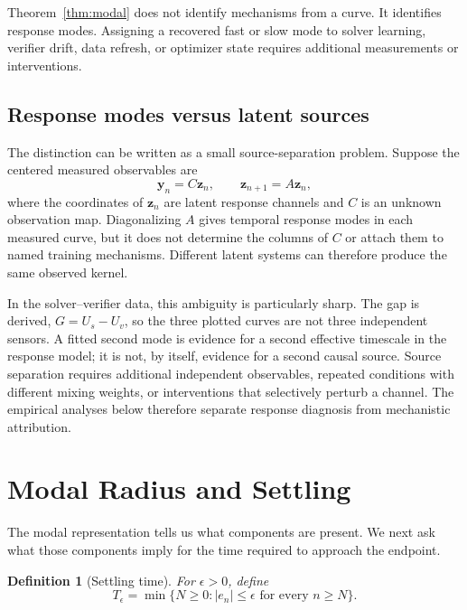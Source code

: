 \documentclass[10pt,twocolumn]{article}
\newtheorem{definition}{Definition}
\begin{document}
Theorem~\ref{thm:modal} does not identify mechanisms from a curve.  It
identifies response modes.  Assigning a recovered fast or slow mode to solver
learning, verifier drift, data refresh, or optimizer state requires additional
measurements or interventions.

\subsection{Response modes versus latent sources}

The distinction can be written as a small source-separation problem.  Suppose
the centered measured observables are
\begin{equation}\label{eq:source-mixing}
 \mathbf y_n=C\mathbf z_n,\qquad \mathbf z_{n+1}=A\mathbf z_n,
\end{equation}
where the coordinates of $\mathbf z_n$ are latent response channels and $C$
is an unknown observation map.  Diagonalizing $A$ gives temporal response modes
in each measured curve, but it does not determine the columns of $C$ or attach
them to named training mechanisms.  Different latent systems can therefore
produce the same observed kernel.

In the solver--verifier data, this ambiguity is particularly sharp.  The gap
is derived, $G=U_s-U_v$, so the three plotted curves are not three independent
sensors.  A fitted second mode is evidence for a second effective timescale in
the response model; it is not, by itself, evidence for a second causal source.
Source separation requires additional independent observables, repeated
conditions with different mixing weights, or interventions that selectively
perturb a channel.  The empirical analyses below therefore separate response
diagnosis from mechanistic attribution.

\section{Modal Radius and Settling}

The modal representation tells us what components are present.  We next ask
what those components imply for the time required to approach the endpoint.

\begin{definition}[Settling time]
For $\epsilon>0$, define
\begin{equation}\label{eq:settling-definition}
 T_\epsilon
 =
 \min\{N\geq0: |e_n|\leq\epsilon\text{ for every }n\geq N\}.
\end{equation}
\end{definition}
\end{document}
